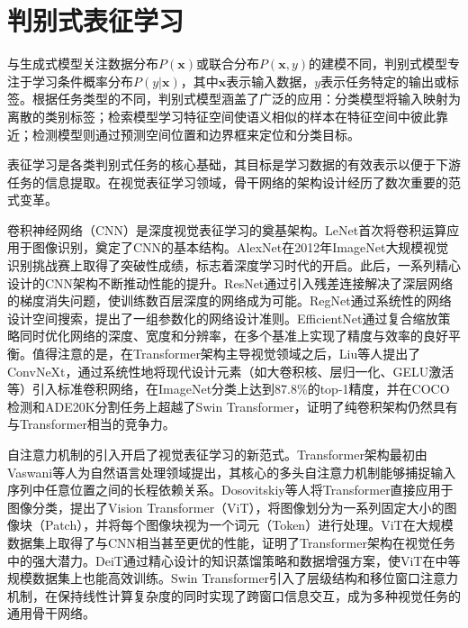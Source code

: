 \section{判别式表征学习}

与生成式模型关注数据分布$P(\mathbf{x})$或联合分布$P(\mathbf{x}, y)$的建模不同，判别式模型专注于学习条件概率分布$P(y|\mathbf{x})$，其中$\mathbf{x}$表示输入数据，$y$表示任务特定的输出或标签。根据任务类型的不同，判别式模型涵盖了广泛的应用：分类模型\cite{agarap2017architecture,albawi2017understanding,deng2012mnist}将输入映射为离散的类别标签；检索模型\cite{lin2015deep,weyand2020google}学习特征空间使语义相似的样本在特征空间中彼此靠近；检测模型\cite{law2018cornernet,ren2015faster}则通过预测空间位置和边界框来定位和分类目标。

表征学习是各类判别式任务的核心基础，其目标是学习数据的有效表示以便于下游任务的信息提取\cite{bengio2013representation}。在视觉表征学习领域，骨干网络的架构设计经历了数次重要的范式变革。

卷积神经网络（CNN）是深度视觉表征学习的奠基架构。LeNet\cite{lecun1998gradient}首次将卷积运算应用于图像识别，奠定了CNN的基本结构。AlexNet\cite{krizhevsky2012imagenet}在2012年ImageNet\cite{deng2009imagenet}大规模视觉识别挑战赛上取得了突破性成绩，标志着深度学习时代的开启。此后，一系列精心设计的CNN架构不断推动性能的提升。ResNet\cite{he2016deep}通过引入残差连接解决了深层网络的梯度消失问题，使训练数百层深度的网络成为可能。RegNet\cite{radosavovic2020designing}通过系统性的网络设计空间搜索，提出了一组参数化的网络设计准则。EfficientNet\cite{tan2019efficientnet}通过复合缩放策略同时优化网络的深度、宽度和分辨率，在多个基准上实现了精度与效率的良好平衡。值得注意的是，在Transformer架构主导视觉领域之后，Liu等人\cite{liu2022convnet}提出了ConvNeXt，通过系统性地将现代设计元素（如大卷积核、层归一化、GELU激活等）引入标准卷积网络，在ImageNet分类上达到87.8\%的top-1精度，并在COCO检测和ADE20K分割任务上超越了Swin Transformer，证明了纯卷积架构仍然具有与Transformer相当的竞争力。

自注意力机制的引入开启了视觉表征学习的新范式。Transformer架构最初由Vaswani等人\cite{vaswani2017attention}为自然语言处理领域提出，其核心的多头自注意力机制能够捕捉输入序列中任意位置之间的长程依赖关系。Dosovitskiy等人\cite{dosovitskiy2020image}将Transformer直接应用于图像分类，提出了Vision Transformer（ViT），将图像划分为一系列固定大小的图像块（Patch），并将每个图像块视为一个词元（Token）进行处理。ViT在大规模数据集上取得了与CNN相当甚至更优的性能，证明了Transformer架构在视觉任务中的强大潜力。DeiT\cite{touvron2021training}通过精心设计的知识蒸馏策略和数据增强方案，使ViT在中等规模数据集上也能高效训练。Swin Transformer\cite{liu2021swin}引入了层级结构和移位窗口注意力机制，在保持线性计算复杂度的同时实现了跨窗口信息交互，成为多种视觉任务的通用骨干网络。

